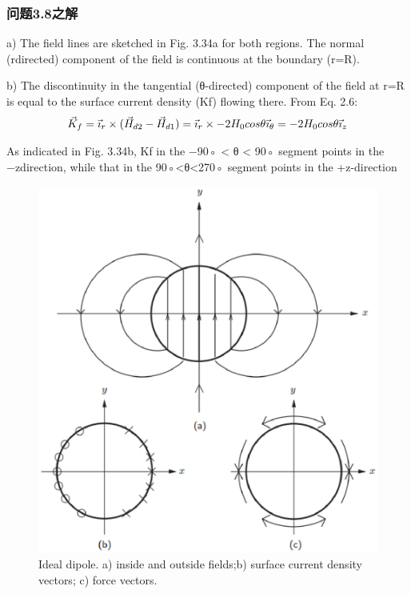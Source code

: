 \subsubsection{问题3.8之解}
a) The field lines are sketched in Fig. 3.34a for both regions. The normal (rdirected) component of the field is continuous at the boundary (r=R).

b) The discontinuity in the tangential (θ-directed) component of the field at
r=R is equal to the surface current density (Kf) flowing there. From Eq. 2.6:
$$
\vec{K}_{f}=\vec{\imath}_{r}\times(\vec{H}_{d2}-\vec{H}_{d1})=\vec{\imath}_{r}\times-2H_{0}cos\theta\vec{\imath}_{\theta}\\
=-2H_{0}cos\theta\vec{\imath}_{z}\\%
$$

As indicated in Fig. 3.34b, Kf in the −90◦ < θ < 90◦ segment points in the −zdirection, while that in the 90◦<θ<270◦ segment points in the +z-direction
\begin{figure}[htbp]
	\centering
	\includegraphics[scale=0.5]{chpt3/figs/fig3.34.eps}
	\caption{Ideal dipole. a) inside and outside fields;b) surface current density vectors; c) force vectors.}
\end{figure}

